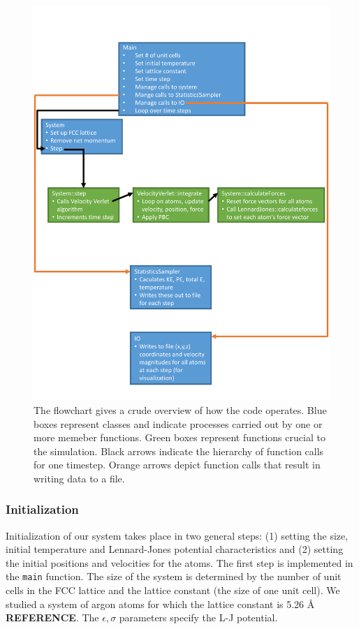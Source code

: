 \documentclass[10pt,showpacs,preprintnumbers,footinbib,amsmath,amssymb,aps,prl,twocolumn,groupedaddress,superscriptaddress,showkeys]{revtex4-1}
\begin{document}
\begin{figure}
	\includegraphics[width=\textwidth]{figures/flowchart.pdf}
	\caption{The flowchart gives a crude overview of how the
	code operates. Blue boxes represent classes and
	indicate processes carried out by one or more memeber
	functions. Green boxes represent functions crucial to the 
	simulation. Black arrows indicate the hierarchy of function
	calls for one timestep. Orange arrows depict function
	calls that result in writing data to a file.}
	\label{fig:flowchart}
\end{figure}
	

\subsubsection*{Initialization}

Initialization of our system takes place in two general steps: (1)
setting the size, initial temperature and Lennard-Jones potential
characteristics and (2) setting the initial positions and velocities
for the atoms. The first step is implemented in the \texttt{main}
function. The size of the system is determined by the number of
unit cells in the FCC lattice and the lattice constant (the size of
one unit cell). We studied a system of argon atoms for which
the lattice constant is 5.26 {\AA} \textbf{REFERENCE}. The
$\epsilon,\sigma$ parameters specify the L-J potential.
\end{document}
